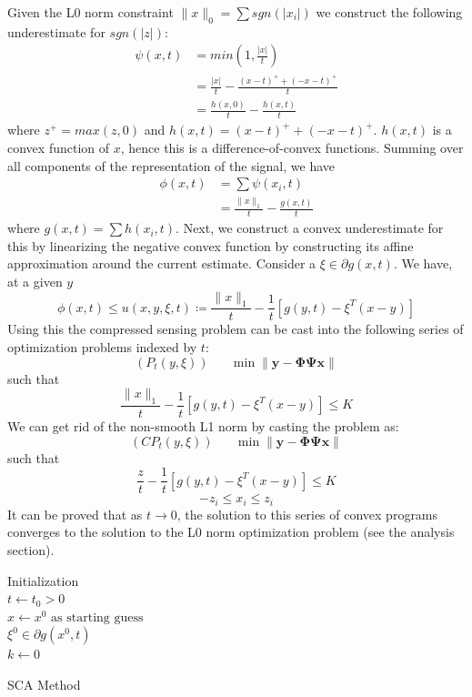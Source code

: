 \documentclass[letterpaper, 10 pt, conference]{article}
\begin{document}
Given the L0 norm constraint
$\|x\|_0 = \sum sgn(|x_i|)$
we construct the following underestimate for $sgn(|z|)$:
\begin{equation*}
\begin{aligned}
\psi(x, t) &= min{\left(1, \frac{|x|}{t}\right)} \\
		   &= \frac{|x|}{t} - \frac{(x-t)^{+} + (-x-t)^{+}}{t} \\
		   &= \frac{h(x, 0)}{t} - \frac{h(x, t)}{t}
\end{aligned}
\end{equation*}
where $z^{+} = max(z, 0)$ and $h(x, t) = (x-t)^{+} + (-x-t)^{+}$. $h(x, t)$ is a convex function of $x$, hence this is a difference-of-convex functions. Summing over all components of the representation of the signal, we have
\begin{equation*}
\begin{aligned}
\phi(x, t) &= \sum \psi(x_i, t) \\
		   &= \frac{\|x\|_1}{t} - \frac{g(x, t)}{t}
\end{aligned}
\end{equation*}
where $g(x, t) = \sum h(x_i, t)$. Next, we construct a convex underestimate for this by linearizing the negative convex function by constructing its affine approximation around the current estimate. Consider a $\xi \in \partial g(x, t)$. We have, at a given $y$
$$\phi(x, t) \leq u(x, y, \xi, t) \coloneqq \frac{\|x\|_1}{t} - \frac{1}{t}\left[g(y, t) - \xi^T (x-y)\right]$$
Using this the compressed sensing problem can be cast into the following series of optimization problems indexed by $t$:
$$(P_t(y, \xi)) \hspace{20pt} \min \|\mathbf{y} - \mathbf{\Phi \Psi x}\|$$
such that
$$\frac{\|x\|_1}{t} - \frac{1}{t}\left[g(y, t) - \xi^T (x-y)\right] \leq K$$
We can get rid of the non-smooth L1 norm by casting the problem as:
$$(CP_t(y, \xi)) \hspace{20pt} \min \|\mathbf{y} - \mathbf{\Phi \Psi x}\|$$
such that
$$\frac{z}{t} - \frac{1}{t}\left[g(y, t) - \xi^T (x-y)\right] \leq K$$
$$-z_i \leq x_i \leq z_i$$
It can be proved that as $t \rightarrow 0$, the solution to this series of convex programs converges to the solution to the L0 norm optimization problem (see the analysis section).

\begin{algorithm}[]
 \KwResult{$\alpha$}
 Initialization\: \\
 $t \leftarrow t_0 > 0$ \\
 $x \leftarrow x^0\text{ as starting guess}$ \\
 $\xi^0 \in \partial g(x^0, t)$ \\
 $k \leftarrow 0$ \\
 \caption{SCA Method}
\end{algorithm}
\end{document}

